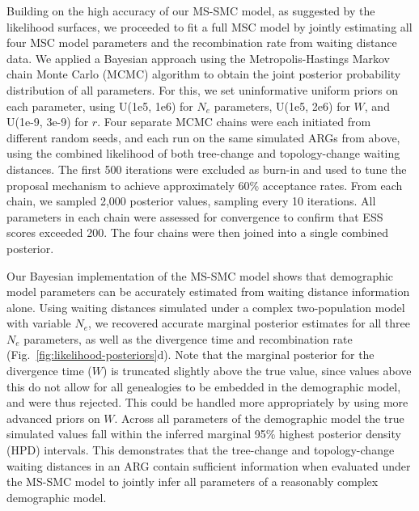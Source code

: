 \documentclass[11pt]{article}
\begin{document}
Building on the high accuracy of our MS-SMC model, as suggested by the likelihood
surfaces, we proceeded to fit a full MSC model by jointly estimating all four MSC
model parameters and the recombination rate from waiting distance data.
We applied a Bayesian approach using the Metropolis-Hastings Markov chain Monte
Carlo (MCMC) algorithm to obtain the joint posterior probability distribution of
all parameters. For this, we set uninformative uniform priors on each parameter,
using U(1e5, 1e6) for $N_e$ parameters, U(1e5, 2e6) for $W$, and U(1e-9, 3e-9) for $r$.
Four separate MCMC chains were each initiated from different random seeds, and 
each run on the same simulated ARGs from above, using the
combined likelihood of both tree-change and topology-change waiting distances.
The first 500 iterations were excluded as burn-in and used to tune the proposal 
mechanism to achieve approximately 60\% acceptance rates. From each chain, we sampled
2,000 posterior values, sampling every 10 iterations. All parameters in each chain
were assessed for convergence to confirm that ESS scores exceeded 200. The four chains 
were then joined into a single combined posterior.

Our Bayesian implementation of the MS-SMC model shows that demographic model 
parameters can be accurately estimated from waiting distance information alone.
Using waiting distances simulated under a complex two-population model with 
variable $N_e$, we recovered accurate marginal posterior estimates for all three 
$N_e$ parameters, as well as the divergence time and recombination rate 
(Fig.~\ref{fig:likelihood-posteriors}d). 
Note that the marginal posterior for the divergence time ($W$) is truncated 
slightly above the true value, since values above this do not allow for
all genealogies to be embedded in the demographic model, and were thus
rejected. 
This could be handled more appropriately by using more advanced priors on $W$. 
Across all parameters of the demographic model the true simulated values
fall within the inferred marginal 95\% highest posterior density (HPD) intervals.
This demonstrates that the tree-change and topology-change waiting distances
in an ARG contain sufficient information when evaluated under the MS-SMC model
to jointly infer all parameters of a reasonably complex demographic model.
\end{document}

